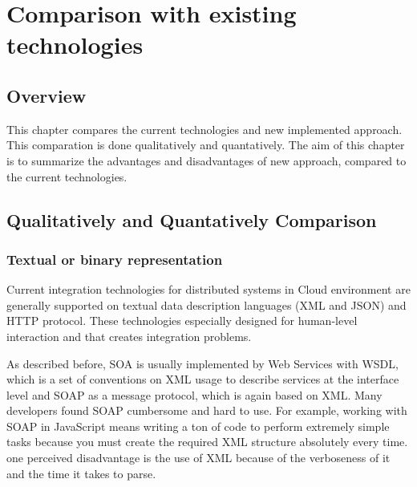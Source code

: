 
\chapter{Comparison with existing technologies}
\label{chapter:comparison}

\section{Overview}
\label{section:overview}

This chapter compares the current technologies and new implemented approach. This comparation is done qualitatively and quantatively. The aim of this chapter is to summarize the advantages and disadvantages of new approach, compared to the current technologies.


\section{Qualitatively and Quantatively Comparison}
\subsection{Textual or binary representation}
\label{section:textualbinary}
Current integration technologies for distributed systems in Cloud environment are generally supported on textual data description languages (XML and JSON) and HTTP protocol. These technologies especially designed for human-level interaction and that creates integration problems.

As described before, SOA is usually implemented by Web Services with WSDL, which is a set of conventions on XML usage to describe services at the interface level and SOAP as a message protocol, which is again based on XML. Many developers found SOAP cumbersome and hard to use. For example, working with SOAP in JavaScript means writing a ton of code to perform extremely simple tasks because you must create the required XML structure absolutely every time. one perceived disadvantage is the use of XML because of the verboseness of it and the time it takes to parse.

